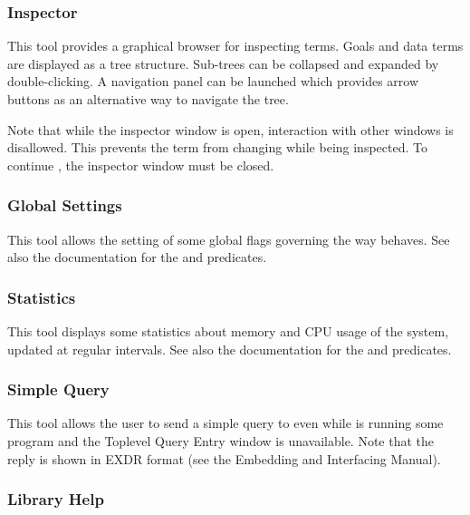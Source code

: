 \subsubsection{Inspector}

This tool provides a graphical browser for inspecting terms.
Goals and data terms are displayed as a tree structure.
Sub-trees can be collapsed and expanded by double-clicking.
A navigation panel can be launched which provides arrow buttons as an
alternative way to navigate the tree.

Note that while the inspector window is open, interaction with other
{\tkeclipse} windows is disallowed.
This prevents the term from changing while being inspected.
To continue {\tkeclipse}, the inspector window must be closed.

\subsubsection{Global Settings}

This tool allows the setting of some global flags governing the way
{\eclipse} behaves.
See also the documentation for the
 and
 predicates.

\subsubsection{Statistics}

This tool displays some statistics about memory and CPU usage of the
{\eclipse} system, updated at regular intervals.
See also the documentation for the
 and
 predicates.

\subsubsection{Simple Query}

This tool allows the user to send a simple query to {\eclipse} even while
{\eclipse} is running some program and the Toplevel Query Entry window
is unavailable.
Note that the reply is shown in EXDR format (see the {\eclipse} Embedding
and Interfacing Manual).

\subsubsection{Library Help}

